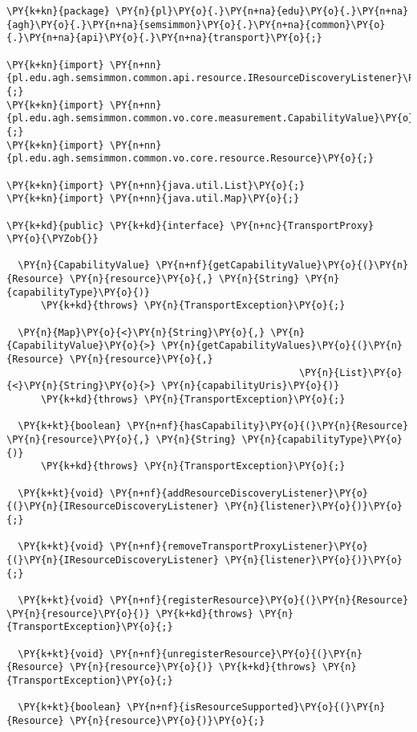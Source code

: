 \begin{Verbatim}[commandchars=\\\{\}]
\PY{k+kn}{package} \PY{n}{pl}\PY{o}{.}\PY{n+na}{edu}\PY{o}{.}\PY{n+na}{agh}\PY{o}{.}\PY{n+na}{semsimmon}\PY{o}{.}\PY{n+na}{common}\PY{o}{.}\PY{n+na}{api}\PY{o}{.}\PY{n+na}{transport}\PY{o}{;}

\PY{k+kn}{import} \PY{n+nn}{pl.edu.agh.semsimmon.common.api.resource.IResourceDiscoveryListener}\PY{o}{;}
\PY{k+kn}{import} \PY{n+nn}{pl.edu.agh.semsimmon.common.vo.core.measurement.CapabilityValue}\PY{o}{;}
\PY{k+kn}{import} \PY{n+nn}{pl.edu.agh.semsimmon.common.vo.core.resource.Resource}\PY{o}{;}

\PY{k+kn}{import} \PY{n+nn}{java.util.List}\PY{o}{;}
\PY{k+kn}{import} \PY{n+nn}{java.util.Map}\PY{o}{;}

\PY{k+kd}{public} \PY{k+kd}{interface} \PY{n+nc}{TransportProxy} \PY{o}{\PYZob{}}

  \PY{n}{CapabilityValue} \PY{n+nf}{getCapabilityValue}\PY{o}{(}\PY{n}{Resource} \PY{n}{resource}\PY{o}{,} \PY{n}{String} \PY{n}{capabilityType}\PY{o}{)}
      \PY{k+kd}{throws} \PY{n}{TransportException}\PY{o}{;}

  \PY{n}{Map}\PY{o}{<}\PY{n}{String}\PY{o}{,} \PY{n}{CapabilityValue}\PY{o}{>} \PY{n}{getCapabilityValues}\PY{o}{(}\PY{n}{Resource} \PY{n}{resource}\PY{o}{,} 
												   \PY{n}{List}\PY{o}{<}\PY{n}{String}\PY{o}{>} \PY{n}{capabilityUris}\PY{o}{)}
      \PY{k+kd}{throws} \PY{n}{TransportException}\PY{o}{;}

  \PY{k+kt}{boolean} \PY{n+nf}{hasCapability}\PY{o}{(}\PY{n}{Resource} \PY{n}{resource}\PY{o}{,} \PY{n}{String} \PY{n}{capabilityType}\PY{o}{)}
      \PY{k+kd}{throws} \PY{n}{TransportException}\PY{o}{;}

  \PY{k+kt}{void} \PY{n+nf}{addResourceDiscoveryListener}\PY{o}{(}\PY{n}{IResourceDiscoveryListener} \PY{n}{listener}\PY{o}{)}\PY{o}{;}

  \PY{k+kt}{void} \PY{n+nf}{removeTransportProxyListener}\PY{o}{(}\PY{n}{IResourceDiscoveryListener} \PY{n}{listener}\PY{o}{)}\PY{o}{;}

  \PY{k+kt}{void} \PY{n+nf}{registerResource}\PY{o}{(}\PY{n}{Resource} \PY{n}{resource}\PY{o}{)} \PY{k+kd}{throws} \PY{n}{TransportException}\PY{o}{;}

  \PY{k+kt}{void} \PY{n+nf}{unregisterResource}\PY{o}{(}\PY{n}{Resource} \PY{n}{resource}\PY{o}{)} \PY{k+kd}{throws} \PY{n}{TransportException}\PY{o}{;}

  \PY{k+kt}{boolean} \PY{n+nf}{isResourceSupported}\PY{o}{(}\PY{n}{Resource} \PY{n}{resource}\PY{o}{)}\PY{o}{;}


\end{Verbatim}
